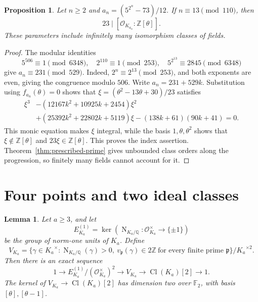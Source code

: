 \documentclass[draft]{publmathdeb}
\newtheorem{proposition}[theorem]{Proposition}
\newtheorem{lemma}[theorem]{Lemma}
\theoremstyle{remark}
\numberwithin{equation}{section}
\newcommand{\Q}{\mathbb Q}
\newcommand{\Z}{\mathbb Z}
\newcommand{\F}{\mathbb F}
\DeclareMathOperator{\Cl}{Cl}
\DeclareMathOperator{\Nm}{N}
\begin{document}
\begin{proposition}\label{prop:nonmaximal}
  Let $n\geq2$ and $a_n=(5^{2^n}-73)/12$. If $n\equiv13\pmod{110}$, then
  \[
    23\mid[\mathcal O_{K_{a_n}}:\Z[\theta]].
  \]
  These parameters include infinitely many isomorphism classes of fields.
\end{proposition}

\begin{proof}
  The modular identities
  \[
    5^{506}\equiv1\pmod{6348},\quad
    2^{110}\equiv1\pmod{253},\quad
    5^{2^{13}}\equiv2845\pmod{6348}
  \]
  give $a_n\equiv231\pmod{529}$. Indeed, $2^n\equiv2^{13}\pmod{253}$, and both exponents are even, giving the congruence modulo $506$. Write $a_n=231+529k$. Substitution using $f_{a_n}(\theta)=0$ shows that $\xi=(\theta^2-13\theta+30)/23$ satisfies
  \begin{align*}
    \xi^3 & -(12167k^2+10925k+2454)\xi^2                    \\
          & +(25392k^2+22802k+5119)\xi-(138k+61)(90k+41)=0.
  \end{align*}
  This monic equation makes $\xi$ integral, while the basis $1,\theta,\theta^2$ shows that $\xi\notin\Z[\theta]$ and $23\xi\in\Z[\theta]$. This proves the index assertion. Theorem~\ref{thm:prescribed-prime} gives unbounded class orders along the progression, so finitely many fields cannot account for it.
\end{proof}

\section{Four points and two ideal classes}

\begin{lemma}\label{lem:virtual-units}
  Let $a\geq3$, and let
  \[
    E_{K_{a}}^{(1)}=\ker(\Nm_{{K_{a}}/\Q}:\mathcal O_{K_{a}}^\times\to\{\pm1\})
  \]
  be the group of norm-one units of $K_a$. Define
  \[
    V_{K_{a}}=\{\gamma\in {K_{a}}^\times:\Nm_{{K_{a}}/\Q}(\gamma)>0,\ v_{\mathfrak p}(\gamma)\in2\Z\ \text{for every finite prime }\mathfrak p\}/{K_{a}}^{\times2}.
  \]
  Then there is an exact sequence
  \[
    1\longrightarrow E_{K_{a}}^{(1)}/(\mathcal O_{K_{a}}^\times)^2
    \longrightarrow V_{K_{a}}\longrightarrow\Cl({K_{a}})[2]\longrightarrow1.
  \]
  The kernel of $V_{K_{a}}\to\Cl({K_{a}})[2]$ has dimension two over $\F_2$, with basis $[\theta],[\theta-1]$.
\end{lemma}
\end{document}
